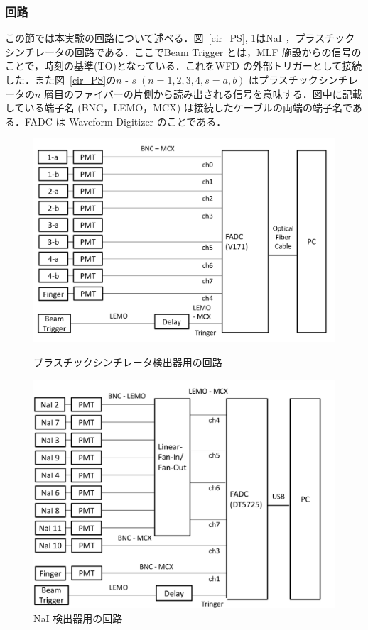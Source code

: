 \subsubsection{回路}
この節では本実験の回路について述べる．図~\ref{cir_PS}, \ref{cir_nai}はNaI ，プラスチックシンチレータの回路である．ここでBeam Trigger とは，MLF 施設からの信号のことで，時刻の基準(TO)となっている．これをWFD の外部トリガーとして接続した．また図~\ref{cir_PS}の$n$ - $s \; (n = 1, 2, 3, 4,  s = a, b)$ はプラスチックシンチレータの$n$ 層目のファイバーの片側から読み出される信号を意味する．図中に記載している端子名 (BNC，LEMO，MCX) は接続したケーブルの両端の端子名である．FADC は Waveform Digitizer のことである．
\begin{figure}[H]
\begin{minipage}{0.45\hsize}
\centering
\includegraphics[width=1\textwidth]{figure/tajima/circuit_ps_2.png}
\caption{プラスチックシンチレータ検出器用の回路}
\label{cir_PS}
\end{minipage}
\hfill
\begin{minipage}{0.45\hsize}
\centering
\includegraphics[width=1\textwidth]{figure/tajima/circuit_nai.png}
\caption{NaI 検出器用の回路}
\label{cir_nai}
\end{minipage}
\end{figure}
